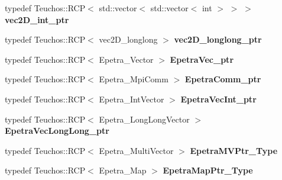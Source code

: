 \begin{DoxyCompactItemize}
\item 
\mbox{\label{classFEDD_1_1ExporterParaViewAMR_a58f61f9bd3b700964b184e554e9e3478}} 
typedef Teuchos\+::\+R\+CP$<$ std\+::vector$<$ std\+::vector$<$ int $>$ $>$ $>$ {\bfseries vec2\+D\+\_\+int\+\_\+ptr}
\item 
\mbox{\label{classFEDD_1_1ExporterParaViewAMR_a3246073b9e4717f898297922651a0b9e}} 
typedef Teuchos\+::\+R\+CP$<$ vec2\+D\+\_\+longlong $>$ {\bfseries vec2\+D\+\_\+longlong\+\_\+ptr}
\item 
\mbox{\label{classFEDD_1_1ExporterParaViewAMR_acfb97ffe09d5b04085f9c0e2158662bf}} 
typedef Teuchos\+::\+R\+CP$<$ Epetra\+\_\+\+Vector $>$ {\bfseries Epetra\+Vec\+\_\+ptr}
\item 
\mbox{\label{classFEDD_1_1ExporterParaViewAMR_a364814a2dc31b987778d984084bf2c36}} 
typedef Teuchos\+::\+R\+CP$<$ Epetra\+\_\+\+Mpi\+Comm $>$ {\bfseries Epetra\+Comm\+\_\+ptr}
\item 
\mbox{\label{classFEDD_1_1ExporterParaViewAMR_a045884bf8773a282e771cae0ac4f6a5d}} 
typedef Teuchos\+::\+R\+CP$<$ Epetra\+\_\+\+Int\+Vector $>$ {\bfseries Epetra\+Vec\+Int\+\_\+ptr}
\item 
\mbox{\label{classFEDD_1_1ExporterParaViewAMR_af659f2e10e0d37bc8bf6d2197a4995d9}} 
typedef Teuchos\+::\+R\+CP$<$ Epetra\+\_\+\+Long\+Long\+Vector $>$ {\bfseries Epetra\+Vec\+Long\+Long\+\_\+ptr}
\item 
\mbox{\label{classFEDD_1_1ExporterParaViewAMR_acadc649fc9344c809da9d79cc727f77d}} 
typedef Teuchos\+::\+R\+CP$<$ Epetra\+\_\+\+Multi\+Vector $>$ {\bfseries Epetra\+M\+V\+Ptr\+\_\+\+Type}
\item 
\mbox{\label{classFEDD_1_1ExporterParaViewAMR_ae023113193df60c063f2d0c662c113a4}} 
typedef Teuchos\+::\+R\+CP$<$ Epetra\+\_\+\+Map $>$ {\bfseries Epetra\+Map\+Ptr\+\_\+\+Type}
\item 
\mbox{\label{classFEDD_1_1ExporterParaViewAMR_aeb01b0bb15a52d67155d7799588af706}} 

\end{DoxyCompactItemize}
